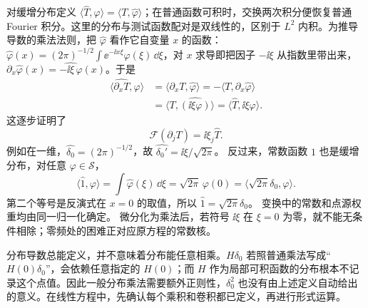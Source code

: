 对缓增分布定义 \(\langle\widehat T,\varphi\rangle=\langle T,\widehat\varphi\rangle\)；在普通函数可积时，交换两次积分便恢复普通 Fourier 积分。这里的分布与测试函数配对是双线性的，区别于 $L^2$ 内积。为推导导数的乘法法则，把 \(\widehat\varphi\) 看作它自变量 \(x\) 的函数：\(\widehat\varphi(x)=(2\pi)^{-1/2}\int\ee^{-\ii x\xi}\varphi(\xi)\,\dd\xi\)，对 \(x\) 求导即把因子 \(-\ii\xi\) 从指数里带出来，\(\partial_x\widehat\varphi(x)=\widehat{-\ii\xi\,\varphi}(x)\)。于是
\[
\begin{aligned}
\langle\widehat{\partial_xT},\varphi\rangle
&=\langle\partial_xT,\widehat\varphi\rangle
=-\langle T,\partial_x\widehat\varphi\rangle\\
&=\langle T,\widehat{(\ii\xi\varphi)}\rangle
=\langle\widehat T,\ii\xi\varphi\rangle.
\end{aligned}
\]
这逐步证明了
\[
\mathcal F(\partial_jT)=\ii\xi_j\widehat T.
\]
例如在一维，$\widehat{\delta_0}=(2\pi)^{-1/2}$，故 $\widehat{\delta_0'}=\ii\xi/\sqrt{2\pi}$。
反过来，常数函数 $1$ 也是缓增分布，对任意 $\varphi\in\mathcal S$，
\[
\langle\widehat 1,\varphi\rangle=\int\widehat\varphi(\xi)\,\dd\xi
=\sqrt{2\pi}\,\varphi(0)=\langle\sqrt{2\pi}\delta_0,\varphi\rangle.
\]
第二个等号是反演式在 $x=0$ 的取值，所以 $\widehat1=\sqrt{2\pi}\delta_0$。
变换中的常数和点源权重均由同一归一化确定。
微分化为乘法后，若符号 $\ii\xi$ 在 $\xi=0$ 为零，就不能无条件相除；零频处的困难正对应原方程的常数核。

分布导数总能定义，并不意味着分布能任意相乘。\(H\delta_0\) 若照普通乘法写成“\(H(0)\delta_0\)”，会依赖任意指定的 \(H(0)\)；而 \(H\) 作为局部可积函数的分布根本不记录这个点值。因此一般分布乘法需要额外正则性，\(\delta_0^2\) 也没有由上述定义自动给出的意义。在线性方程中，先确认每个乘积和卷积都已定义，再进行形式运算。

